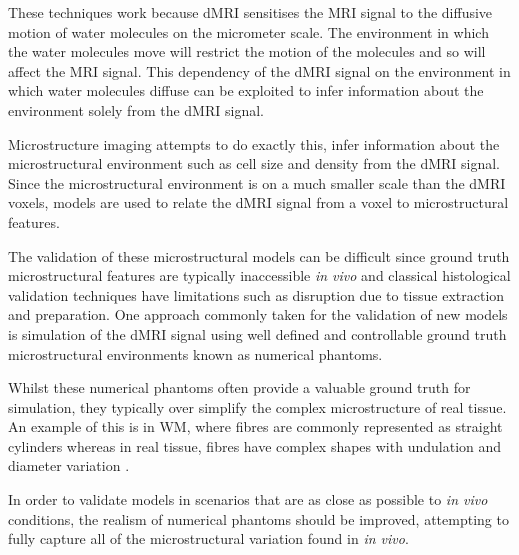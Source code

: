 \begin{comment}
\ac{MRI} provides researchers and clinicians a powerful and flexible tool for non-invasively imaging the human body \emph{in vivo} and has found extensive use over the past few decades in furthering the understanding the structure and function of the human brain.
One technique which is commonly employed to study the structure of the human brain is \ac{dMRI}.
\end{comment}

These techniques work because \ac{dMRI} sensitises the \ac{MRI} signal to the diffusive motion of water molecules on the micrometer scale.
The environment in which the water molecules move will restrict the motion of the molecules and so will affect the \ac{MRI} signal. 
This dependency of the \ac{dMRI} signal on the environment in which water molecules diffuse can be exploited to infer information about the environment solely from the \ac{dMRI} signal.  


Microstructure imaging attempts to do exactly this, infer information about the microstructural environment such as cell size and density from the \ac{dMRI} signal.
Since the microstructural environment is on a much smaller scale than the \ac{dMRI} voxels, models are used to relate the \ac{dMRI} signal from a voxel to microstructural features.

The validation of these microstructural models can be difficult since ground truth microstructural features are typically inaccessible \emph{in vivo} and classical histological validation techniques have limitations such as disruption due to tissue extraction and preparation. 
One approach commonly taken for the validation of new models is simulation of the \ac{dMRI} signal using well defined and controllable ground truth microstructural environments known as numerical phantoms. 

Whilst these numerical phantoms often provide a valuable ground truth for simulation, they typically over simplify the complex microstructure of real tissue.
An example of this is in \ac{WM}, where fibres are commonly represented as straight cylinders \cite{Hall2009,Leemans2005} whereas in real tissue, fibres have complex shapes with undulation and diameter variation \cite{Abdollahzadeh2019, Lee2019b}.

In order to validate models in scenarios that are as close as possible to \emph{in vivo} conditions, the realism of numerical phantoms should be improved, attempting to fully capture all of the microstructural variation found in \emph{in vivo}.

